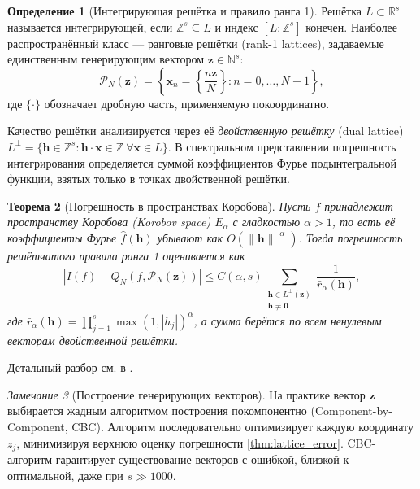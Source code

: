 \documentclass[12pt, a4paper]{article}
\theoremstyle{plain}
\newtheorem{theorem}{Теорема}[section]
\theoremstyle{definition}
\newtheorem{definition}[theorem]{Определение}
\theoremstyle{remark}
\newtheorem{remark}[theorem]{Замечание}
\newcommand{\NN}{\mathbb{N}}
\newcommand{\ZZ}{\mathbb{Z}}
\newcommand{\RR}{\mathbb{R}}
\newcommand{\vx}{\boldsymbol{x}}
\newcommand{\vz}{\boldsymbol{z}}
\newcommand{\vh}{\boldsymbol{h}}
\newcommand{\vzero}{\boldsymbol{0}}
\newcommand{\PP}{\mathcal{P}}
\newcommand{\abs}[1]{\left| #1 \right|}
\begin{document}
\begin{definition}[Интегрирующая решётка и правило ранга 1]
    Решётка $L \subset \RR^s$ называется интегрирующей, если $\ZZ^s \subseteq L$ и индекс $[L : \ZZ^s]$ конечен. Наиболее распространённый класс --- ранговые решётки (rank-1 lattices), задаваемые единственным генерирующим вектором $\vz \in \NN^s$:
    \begin{equation}
        \PP_N(\vz) = \left\{ \vx_n = \left\{ \frac{n \vz}{N} \right\} : n = 0, \dots, N-1 \right\},
    \end{equation}
    где $\{ \cdot \}$ обозначает дробную часть, применяемую покоординатно.
\end{definition}

Качество решётки анализируется через её \textit{двойственную решётку} (dual lattice) $L^\perp = \{ \vh \in \ZZ^s : \vh \cdot \vx \in \ZZ \ \forall \vx \in L \}$. В спектральном представлении погрешность интегрирования определяется суммой коэффициентов Фурье подынтегральной функции, взятых только в точках двойственной решётки.

\begin{theorem}[Погрешность в пространствах Коробова]
    \label{thm:lattice_error}
    Пусть $f$ принадлежит пространству Коробова (Korobov space) $E_\alpha$ с гладкостью $\alpha > 1$, то есть её коэффициенты Фурье $\hat{f}(\vh)$ убывают как $O(\|\vh\|^{-\alpha})$. Тогда погрешность решётчатого правила ранга 1 оценивается как
    \begin{equation}
        \abs{I(f) - Q_N(f, \PP_N(\vz))} \le C(\alpha, s) \sum_{\substack{\vh \in L^\perp(\vz) \\ \vh \neq \vzero}} \frac{1}{\bar{r}_\alpha(\vh)},
    \end{equation}
    где $\bar{r}_\alpha(\vh) = \prod_{j=1}^s \max(1, |h_j|)^\alpha$, а сумма берётся по всем ненулевым векторам двойственной решётки.
\end{theorem}

Детальный разбор см. в \cite{sloan2002high}.

\begin{remark}[Построение генерирующих векторов]
    На практике вектор $\vz$ выбирается жадным алгоритмом построения покомпонентно (Component-by-Component, CBC). Алгоритм последовательно оптимизирует каждую координату $z_j$, минимизируя верхнюю оценку погрешности \eqref{thm:lattice_error}. CBC-алгоритм гарантирует существование векторов с ошибкой, близкой к оптимальной, даже при $s \gg 1000$.
\end{remark}
\end{document}
